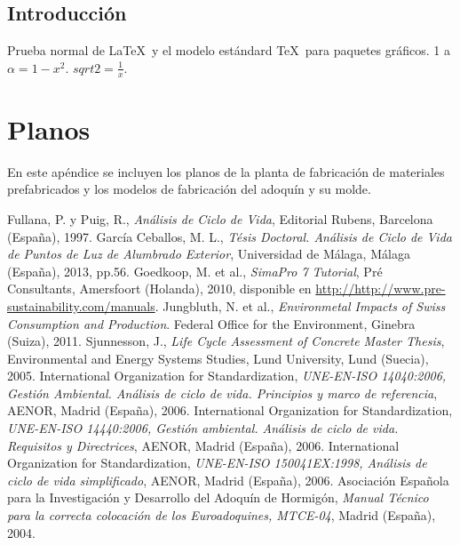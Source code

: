 \documentclass[12pt,titlepage,openright]{report}
\begin{document}
\section{Introducción}

Prueba normal de \LaTeX\ y el modelo\cite{mlgceballos} estándard \TeX\ para paquetes gráficos. 1 a $\alpha=1-x^2$. $sqrt{2}=\frac{1}{x}$.

\lipsum

\newpage
\appendix
\chapter{Planos}\label{aped.A}
En este apéndice se incluyen los planos de la planta de fabricación de materiales prefabricados y los modelos de fabricación del adoquín y su molde.

\cleardoublepage
{}
% 
\begin{thebibliography}{100}
Fullana, P. y Puig, R., \emph{Análisis de Ciclo de Vida}, Editorial Rubens, Barcelona (España), 1997.
García Ceballos, M. L., \emph{Tésis Doctoral. Análisis de Ciclo de Vida de Puntos de Luz de Alumbrado Exterior}, Universidad de Málaga, Málaga (España), 2013, pp.56.
Goedkoop, M. et al., \emph{SimaPro 7 Tutorial}, Pré Consultants, Amersfoort (Holanda), 2010, disponible en \url{http://http://www.pre-sustainability.com/manuals}.
Jungbluth, N. et al., \emph{Environmetal Impacts of Swiss Consumption and Production}. Federal Office for the Environment, Ginebra (Suiza), 2011.
Sjunnesson, J., \emph{Life Cycle Assessment of Concrete Master Thesis}, Environmental and Energy Systems Studies, Lund University, Lund (Suecia), 2005.
International Organization for Standardization, \emph{UNE-EN-ISO 14040:2006, Gestión Ambiental. Análisis de ciclo de vida. Principios y marco de referencia}, AENOR, Madrid (España), 2006.
International Organization for Standardization, \emph{UNE-EN-ISO 14440:2006, Gestión ambiental. Análisis de ciclo de vida. Requisitos y Directrices}, AENOR, Madrid (España), 2006.
International Organization for Standardization, \emph{UNE-EN-ISO 150041EX:1998, Análisis de ciclo de vida simplificado}, AENOR, Madrid (España), 2006.
Asociación Española para la Investigación y Desarrollo del Adoquín de Hormigón, \emph{Manual Técnico para la correcta colocación de los Euroadoquines, MTCE-04}, Madrid (España), 2004.
\end{thebibliography}
\end{document}
